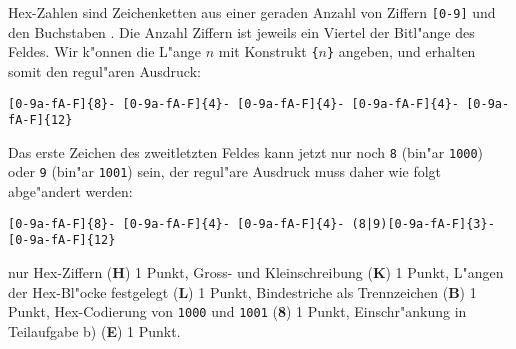 \begin{loesung}
\begin{teilaufgaben}
\item
Hex-Zahlen sind Zeichenketten aus einer geraden Anzahl von
Ziffern \texttt{[0-9]} und den Buchstaben \text{[a-fA-F]}.
Die Anzahl Ziffern ist jeweils ein Viertel der Bitl"ange des Feldes.
Wir k"onnen die L"ange $n$ mit Konstrukt \texttt{\{$n$\}} angeben,
und erhalten somit den regul"aren Ausdruck:
\begin{center}
\texttt{[0-9a-fA-F]\{8\}-%
[0-9a-fA-F]\{4\}-%
[0-9a-fA-F]\{4\}-%
[0-9a-fA-F]\{4\}-%
[0-9a-fA-F]\{12\}}
\end{center}
\item
Das erste Zeichen des zweitletzten Feldes kann jetzt nur noch
\texttt{8} (bin"ar \texttt{1000}) oder \texttt{9} (bin"ar \texttt{1001})
sein, der regul"are Ausdruck muss daher wie folgt abge"andert
werden:
\begin{center}
\texttt{[0-9a-fA-F]\{8\}-%
[0-9a-fA-F]\{4\}-%
[0-9a-fA-F]\{4\}-%
(8|9)[0-9a-fA-F]\{3\}-%
[0-9a-fA-F]\{12\}}
\end{center}
\qedhere
\end{teilaufgaben}
\end{loesung}

\begin{bewertung}
nur Hex-Ziffern ({\bf H}) 1 Punkt,
Gross- und Kleinschreibung ({\bf K}) 1 Punkt,
L"angen der Hex-Bl"ocke festgelegt ({\bf L}) 1 Punkt,
Bindestriche als Trennzeichen ({\bf B}) 1 Punkt,
Hex-Codierung von \texttt{1000} und \texttt{1001} ({\bf 8}) 1 Punkt,
Einschr"ankung in Teilaufgabe b) ({\bf E}) 1 Punkt.
\end{bewertung}

